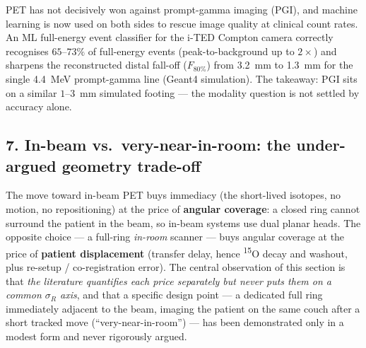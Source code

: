 \documentclass[11pt]{article}
\newcommand{\iso}[2]{\textsuperscript{#1}#2}
\begin{document}
PET has not decisively won against prompt-gamma imaging (PGI), and machine learning
is now used on both sides to rescue image quality at clinical count rates. An ML
full-energy event classifier for the i-TED Compton camera \cite{iTED2022} correctly
recognises $65$--$73\%$ of full-energy events (peak-to-background up to $2\times$)
and sharpens the reconstructed distal fall-off ($F_{80\%}$) from 3.2~mm to 1.3~mm
for the single 4.4~MeV prompt-gamma line (Geant4 simulation). The takeaway: PGI
sits on a similar $1$--$3$~mm simulated footing --- the modality question is not
settled by accuracy alone.

\subsection*{7. In-beam vs.\ very-near-in-room: the under-argued geometry
trade-off}

The move toward in-beam PET buys immediacy (the short-lived isotopes, no motion,
no repositioning) at the price of \textbf{angular coverage}: a closed ring cannot
surround the patient in the beam, so in-beam systems use dual planar heads. The
opposite choice --- a full-ring \emph{in-room} scanner --- buys angular coverage
at the price of \textbf{patient displacement} (transfer delay, hence
\iso{15}{O} decay and washout, plus re-setup / co-registration error). The
central observation of this section is that \emph{the literature quantifies each
price separately but never puts them on a common $\sigma_R$ axis}, and that a
specific design point --- a dedicated full ring immediately adjacent to the beam,
imaging the patient on the same couch after a short tracked move (``very-near-in-room'')
--- has been demonstrated only in a modest form and never rigorously argued.
\end{document}
